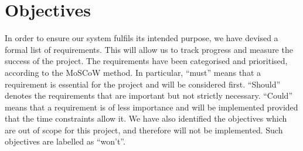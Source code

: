 \chapter{Objectives} %

In order to ensure our system fulfils its intended purpose, we have devised a formal list of requirements. This will allow us to track progress and measure the success of the project. The requirements have been categorised and prioritised, according to the MoSCoW method. In particular, ``must'' means that a requirement is essential for the project and will be considered first. ``Should'' denotes the requirements that are important but not strictly necessary. ``Could'' means that a requirement is of less importance and will be implemented provided that the time constraints allow it. We have also identified the objectives which are out of scope for this project, and therefore will not be implemented. Such objectives are labelled as ``won't''.

